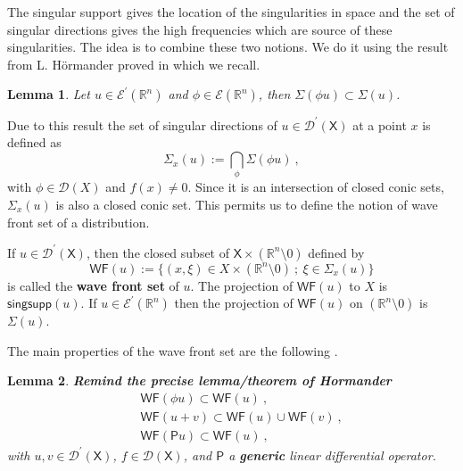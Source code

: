 \documentclass[11pt]{book}
\newcommand{\com}[1]{{\color{red}\bf #1}}
\newcommand{\WF}{\mathsf{WF}}
\newcommand{\Dcal}{\mathcal{D}}
\newcommand{\Ecal}{\mathcal{E}}
\newcommand{\Rbb}{\mathbb{R}}
\newcommand{\Psf}{\mathsf{P}}
\newcommand{\Xsf}{\mathsf{X}}
\theoremstyle{break}
\newtheorem{lemma}{Lemma}[chapter]
\begin{document}
The singular support gives the location of the singularities in space and the set of singular directions gives the high frequencies which are source of these singularities. The idea is to combine these two notions. We do it using the result from L. Hörmander proved in \cite{hormander_analysis_1990} which we recall.
%
\begin{lemma}
Let $u \in \Ecal^\prime(\Rbb^n)$ and $\phi \in \Ecal(\Rbb^n)$, then $\Sigma(\phi u) \subset \Sigma(u)$. 
\end{lemma}
%
Due to this result the set of singular directions of $u\in\Dcal^\prime(\Xsf)$ at a point $x$ is defined as
%
\begin{equation*}
\Sigma_x(u) := \underset{\phi}{\bigcap} \Sigma(\phi u) \ , 
\end{equation*}
%
with $\phi \in \Dcal(X)$ and $f(x) \neq 0$. Since it is an intersection of closed conic sets, $\Sigma_x(u)$ is also a closed conic set. This permits us to define the notion of wave front set of a distribution. 


If $u \in \Dcal^\prime(\Xsf)$, then the closed subset of $\Xsf \times (\Rbb^n \setminus 0)$ defined by
%
\begin{equation*}
\WF(u) := \bigg\{ (x,\xi) \in X \times (\Rbb^n \setminus 0) \ ; \ \xi \in \Sigma_x(u) \bigg\}
\end{equation*}
%
is called the \textbf{wave front set} of $u$. The projection of $\WF(u)$ to $X$ is $\mathsf{singsupp}(u)$. If $u \in \Ecal^\prime(\Rbb^n)$ then the projection of $\WF(u)$ on $(\Rbb^n \setminus 0)$ is $\Sigma(u)$. 


The main properties of the wave front set are the following \cite{hormander_analysis_1990}.


\begin{lemma}
\com{Remind the precise lemma/theorem of Hormander}
%
\begin{eqnarray}
&& \WF(\phi u) \subset \WF(u) \ , \nonumber \\
&& \WF(u+v) \subset \WF(u) \cup \WF(v) \ , \\ 
&& \WF(\Psf u) \subset \WF(u) \ , \nonumber
\label{eq:prop_wf}
\end{eqnarray}
%
with $u,v \in \Dcal^\prime(\Xsf)$, $f\in\Dcal(\Xsf)$, and $\Psf$ a \com{generic} linear differential operator. 
\end{lemma}
\end{document}
